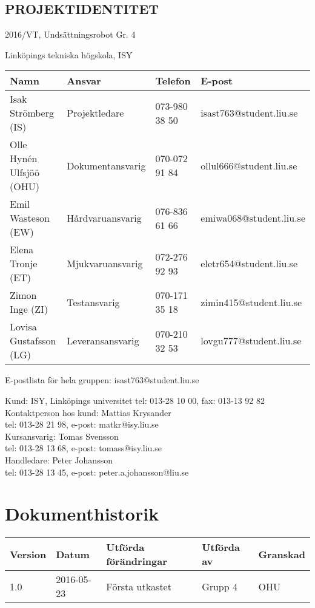 \documentclass[11pt]{article}
\begin{document}
\pagebreak
\begin{center}

\section*{PROJEKTIDENTITET}
2016/VT, Undsättningsrobot Gr. 4

Linköpings tekniska högskola, ISY
\vspace{5em}

\begin{tabular}{|l|l|l|l|} \hline
\textbf{Namn} & \textbf{Ansvar} & \textbf{Telefon} & \textbf{E-post}  \\ \hline 
Isak Strömberg (IS) & Projektledare & 073-980 38 50 & isast763@student.liu.se \\ \hline
Olle Hynén Ulfsjöö (OHU)& Dokumentansvarig & 070-072 91 84 & ollul666@student.liu.se \\ \hline
Emil Wasteson (EW) & Hårdvaruansvarig & 076-836 61 66 & emiwa068@student.liu.se \\ \hline
Elena Tronje (ET) & Mjukvaruansvarig & 072-276 92 93 & eletr654@student.liu.se \\ \hline
Zimon Inge (ZI) & Testansvarig & 070-171 35 18 & zimin415@student.liu.se \\ \hline
Lovisa Gustafsson (LG) & Leveransansvarig & 070-210 32 53 & lovgu777@student.liu.se \\ \hline
\end{tabular}


E-postlista för hela gruppen: isast763@student.liu.se

\vspace{5em}
Kund: ISY, Linköpings universitet 
tel: 013-28 10 00, fax: 013-13 92 82 \\
Kontaktperson hos kund: Mattias Krysander \\
tel: 013-28 21 98, e-post: matkr@isy.liu.se \\

\vspace{5em}
Kursansvarig:  Tomas Svensson\\
tel: 013-28 13 68, e-post: tomass@isy.liu.se \\
Handledare: Peter Johansson \\
tel: 013-28 13 45, e-post: peter.a.johansson@liu.se
\end{center}
\pagebreak

\tableofcontents

\pagebreak

\section*{Dokumenthistorik}
\begin{table}[h]
\begin{tabular}{|l|l|l|l|l|} \hline

\textbf{Version} & \textbf{Datum} & \textbf{Utförda förändringar} & \textbf{Utförda av} & \textbf{Granskad} \\ \hline
1.0 & 2016-05-23 & Första utkastet & Grupp 4 & OHU \\ \hline
\end{tabular}
\end{table}
\end{document}
